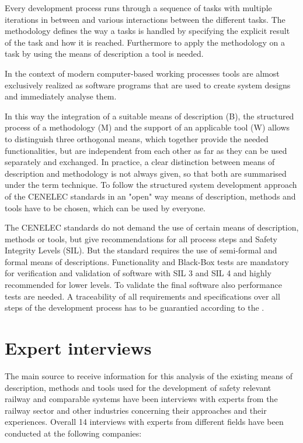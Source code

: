 \documentclass{./template/openetcs2}
\begin{document}
 Every development process runs through a sequence of tasks with multiple iterations in between and various interactions between the different tasks. The methodology defines the way a tasks is handled by specifying the explicit result of the task and how it is reached. Furthermore to apply the methodology on a task by using the means of description a tool is needed. 

In the context of modern computer-based working processes tools are almost exclusively realized as software programs that are used to create system designs and immediately analyse them. 

In this way the integration of a suitable means of description (B),  the structured process of a methodology (M) and the support of an applicable tool (W) allows to distinguish three orthogonal means, which together provide the needed functionalities, but are independent from each other as far as they can be used separately and exchanged. In practice, a clear distinction between means of description and methodology is not always given, so that both are summarised under the term technique. To follow the structured system development approach of the CENELEC standards in an "open" way means of description, methods and tools have to be chosen, which can be used by everyone. 

The CENELEC standards do not demand the use of certain means of description, methods or tools, but give recommendations for all process steps and Safety Integrity Levels (SIL). But the standard requires the use of semi-formal and formal means of descriptions. Functionality and Black-Box tests are mandatory for verification and validation of software with SIL 3 and SIL 4 and highly recommended for lower levels. To validate the final software also performance tests are needed. A traceability of all requirements and specifications over all steps of the development process has to be guarantied according to the \citeauthor{EN50128:2011}. 

\chapter{Expert interviews}

The main source to receive information for this analysis of the existing means of description, methods and tools used for the  development of safety relevant railway and comparable systems have been interviews with experts from the railway sector and other  industries concerning their approaches and their experiences. Overall 14 interviews  with experts from different fields have been conducted  at the following companies:
\end{document}
